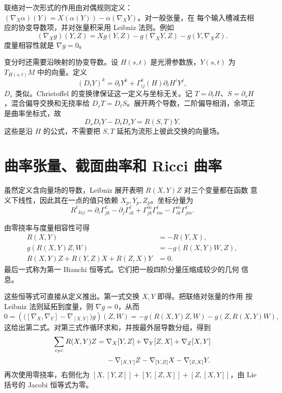 联络对一次形式的作用由对偶规则定义：
$(\nabla_X\alpha)(Y)=X(\alpha(Y))-\alpha(\nabla_XY)$。对一般张量，在
每个输入槽减去相应的协变导数项，并对张量积采用 Leibniz 法则。例如
\[
 (\nabla_Xg)(Y,Z)=Xg(Y,Z)-g(\nabla_XY,Z)-g(Y,\nabla_XZ).
\]
度量相容性就是 $\nabla g=0$。

变分时还需要沿映射的协变导数。设 $H(s,t)$ 是光滑参数族，$Y(s,t)$ 为
$T_{H(s,t)}M$ 中的向量。定义
\[
 (D_tY)^k=\partial_tY^k+\Gamma^k_{ij}(H)\partial_tH^iY^j,
\]
$D_s$ 类似。Christoffel 的变换律保证这一定义与坐标无关。记
$T=\partial_tH$、$S=\partial_sH$，混合偏导交换和无挠率给
$D_sT=D_tS$。展开两个导数，二阶偏导相消，余项正是曲率坐标式，故
\begin{equation}\label{eq:parameter-covariant-commutator}
 D_sD_tY-D_tD_sY=R(S,T)Y.
\end{equation}
这些是沿 $H$ 的公式，不需要把 $S,T$ 延拓为流形上彼此交换的向量场。

\section{曲率张量、截面曲率和 Ricci 曲率}

虽然定义含向量场的导数，Leibniz 展开表明 $R(X,Y)Z$ 对三个变量都在函数
意义下线性，因此其在一点的值只依赖 $X_p,Y_p,Z_p$。坐标分量为
\begin{equation}\label{eq:riemannian-curvature-coordinate}
 R^\ell{}_{kij}
 =\partial_i\Gamma^\ell_{jk}-\partial_j\Gamma^\ell_{ik}
 +\Gamma^m_{jk}\Gamma^\ell_{im}
 -\Gamma^m_{ik}\Gamma^\ell_{jm}.
\end{equation}

由零挠率与度量相容性可得
\begin{equation}\label{eq:riemannian-curvature-symmetries}\begin{aligned}
 R(X,Y)&=-R(Y,X),\\
 g(R(X,Y)Z,W)&=-g(R(X,Y)W,Z),\\
 R(X,Y)Z+R(Y,Z)X+R(Z,X)Y&=0.
\end{aligned}\end{equation}
最后一式称为第一 Bianchi 恒等式。它们把一般四阶分量压缩成较少的几何
信息。

这些恒等式可直接从定义推出。第一式交换 $X,Y$ 即得。把联络对张量的作用
按 Leibniz 法则延拓到度量，则 $\nabla g=0$，从而
\[
0=\left(\bigl([\nabla_X,\nabla_Y]-\nabla_{[X,Y]}\bigr)g\right)(Z,W)
 =-g(R(X,Y)Z,W)-g(Z,R(X,Y)W),
\]
这给出第二式。对第三式作循环求和，并按最外层导数分组，得到
\begin{align*}
 \sum_{\rm cyc}R(X,Y)Z
={}&\nabla_X[Y,Z]+\nabla_Y[Z,X]+\nabla_Z[X,Y]\\
 &-\nabla_{[X,Y]}Z-\nabla_{[Y,Z]}X-\nabla_{[Z,X]}Y.
\end{align*}
再次使用零挠率，右侧化为
$[X,[Y,Z]]+[Y,[Z,X]]+[Z,[X,Y]]$，由 Lie 括号的 Jacobi 恒等式为零。

